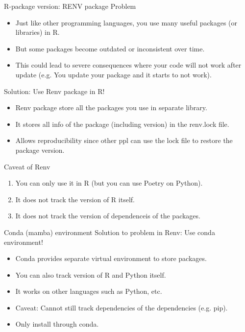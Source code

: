 \documentclass[10pt]{beamer}
\begin{document}
\begin{frame}{R-package version: RENV package}
	Problem
	\begin{itemize}
		\item Just like other programming languages, you use many useful packages (or libraries) in R.
		\item But some packages become outdated or inconsistent over time.
		\item This could lead to severe consequences where your code will not work after update (e.g. You update your package and it starts to not work).
	\end{itemize}\vspace{5mm}

	Solution: Use Renv package in R!
	\begin{itemize}
		\item Renv package store all the packages you use in separate library.
		\item It stores all info of the package (including version) in the renv.lock file.
		\item Allows reproducibility since other ppl can use the lock file to restore the package version.
	\end{itemize}
\end{frame}

\begin{frame}{Caveat of Renv}
	\begin{enumerate}
		\item You can only use it in R (but you can use Poetry on Python).
		\item It does not track the version of R itself.
		\item It does not track the version of dependenceis of the packages.
	\end{enumerate}
\end{frame}

\begin{frame}{Conda (mamba) environment}
Solution to problem in Renv: Use conda environment!
\begin{itemize}
	\item Conda provides separate virtual environment to store packages.
	\item You can also track version of R and Python itself.
	\item It works on other languages such as Python, etc.
	\item Caveat: Cannot still track dependencies of the dependencies (e.g. pip).
	\item Only install through conda.
\end{itemize}

\end{frame}
\end{document}
